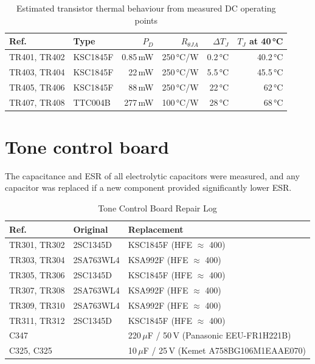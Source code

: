 \documentclass[]{article}
\begin{document}
\begin{table}[H]
\centering
\caption{Estimated transistor thermal behaviour from measured DC operating points}
\label{tab:function_board_transistor_thermal}
\begin{tabular}{|l|l|r|r|r|r|}
\hline
\textbf{Ref.} & \textbf{Type} & \textbf{$P_D$} & \textbf{$R_{\theta JA}$} & \textbf{$\Delta T_J$} & \textbf{$T_J$ at 40\,°C} \\
\hline
TR401, TR402 & KSC1845F & 0.85\,mW & 250\,°C/W & 0.2\,°C & 40.2\,°C \\
TR403, TR404 & KSC1845F & 22\,mW & 250\,°C/W & 5.5\,°C & 45.5\,°C \\
TR405, TR406 & KSC1845F & 88\,mW & 250\,°C/W & 22\,°C & 62\,°C \\
TR407, TR408 & TTC004B & 277\,mW & 100\,°C/W & 28\,°C & 68\,°C \\
\hline
\end{tabular}
\end{table}

\section{Tone control board}

The capacitance and ESR of all electrolytic capacitors were measured, and any capacitor was replaced if a new component provided significantly lower ESR.

\begin{table}[H]
	\centering
	\caption{Tone Control Board Repair Log}
	\label{tab:repair_log_tone_control_board}
	\begin{tabular}{|l|l|l|}
		\hline
		\textbf{Ref.} & \textbf{Original} & \textbf{Replacement} \\
		\hline
		TR301, TR302 & 2SC1345D & KSC1845F (HFE $\approx$ 400) \\
        TR303, TR304 & 2SA763WL4 & KSA992F (HFE $\approx$ 400) \\
		TR305, TR306 & 2SC1345D & KSC1845F (HFE $\approx$ 400) \\
        TR307, TR308 & 2SA763WL4 & KSA992F (HFE $\approx$ 400) \\
        TR309, TR310 & 2SA763WL4 & KSA992F (HFE $\approx$ 400) \\
		TR311, TR312 & 2SC1345D & KSC1845F (HFE $\approx$ 400) \\
		\hline
		C347 &  &   220\,$\mu$F / 50\,V (Panasonic EEU-FR1H221B) \\
		C325, C325& & 10\,$\mu$F / 25\,V (Kemet A758BG106M1EAAE070) \\
		\hline
	\end{tabular}
\end{table}
\end{document}
